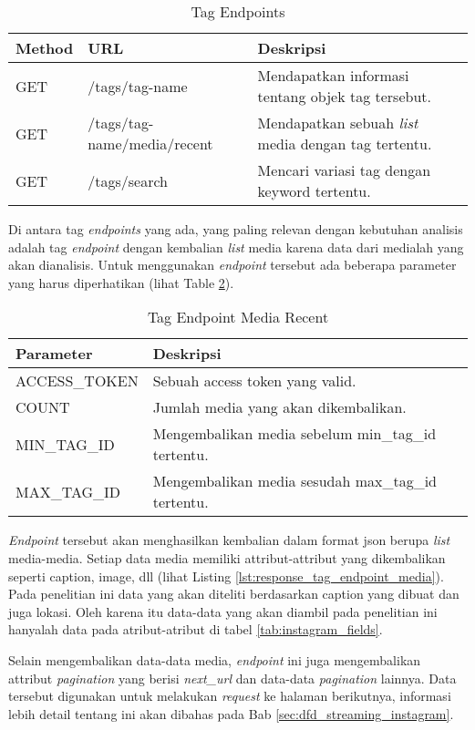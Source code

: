 \begin{table}[H]
	\centering
	\begin{tabular}{| l | l | l |}
		\hline
		Method & URL & Deskripsi \\
		\hline
		GET & /tags/tag-name & Mendapatkan informasi tentang objek tag tersebut. \\
		GET & /tags/tag-name/media/recent & Mendapatkan sebuah \textit{list} media dengan tag tertentu. \\
		GET & /tags/search & Mencari variasi tag dengan keyword tertentu.\\
		\hline
	\end{tabular}	
	\caption{Tag Endpoints}\label{tab:tag_endpoints}
\end{table}	

Di antara tag \textit{endpoints} yang ada, yang paling relevan dengan kebutuhan analisis adalah tag \textit{endpoint} dengan kembalian \textit{list} media karena data dari medialah yang akan dianalisis. Untuk menggunakan \textit{endpoint} tersebut ada beberapa parameter yang harus diperhatikan (lihat Table \ref{tab:tag_endpoints_media}).

\begin{table}[H]
	\centering
	\begin{tabular}{| l | l |}
		\hline
		Parameter & Deskripsi \\
		\hline
		ACCESS\_TOKEN & Sebuah access token yang valid. \\
		COUNT & Jumlah media yang akan dikembalikan. \\
		MIN\_TAG\_ID & Mengembalikan media sebelum min\_tag\_id tertentu. \\
		MAX\_TAG\_ID & Mengembalikan media sesudah max\_tag\_id tertentu. \\
		\hline
	\end{tabular}	
	\caption{Tag Endpoint Media Recent}\label{tab:tag_endpoints_media}
\end{table}	

\textit{Endpoint} tersebut akan menghasilkan kembalian dalam format json berupa \textit{list} media-media. Setiap data media memiliki attribut-attribut yang dikembalikan seperti caption, image, dll (lihat Listing \ref{lst:response_tag_endpoint_media}). Pada penelitian ini data yang akan diteliti berdasarkan caption yang dibuat dan juga lokasi. Oleh karena itu data-data yang akan diambil pada penelitian ini hanyalah data pada atribut-atribut di tabel \ref{tab:instagram_fields}. 

Selain mengembalikan data-data media, \textit{endpoint} ini juga mengembalikan attribut \textit{pagination} yang berisi \textit{next\_url} dan data-data \textit{pagination} lainnya. Data tersebut digunakan untuk melakukan \textit{request} ke halaman berikutnya, informasi lebih detail tentang ini akan dibahas pada Bab \ref{sec:dfd_streaming_instagram}.

